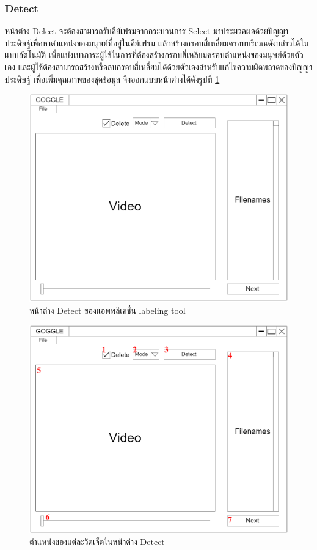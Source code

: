 \subsubsection{Detect}
หน้าต่าง Delect จะต้องสามารถรับคีย์เฟรมจากกระบวนการ Select มาประมวลผลด้วยปัญญาประดิษฐ์เพื่อหาตำแหน่งของมนุษย์ที่อยู่ในคีย์เฟรม 
แล้วสร้างกรอบสี่เหลี่ยมครอบบริเวณดังกล่าวได้ในแบบอัตโนมัติ เพื่อแบ่งเบาภาระผู้ใช้ในการที่ต้องสร้างกรอบสี่เหลี่ยมครอบตำแหน่งของมนุษย์ด้วยตัวเอง
และผู้ใช้ต้องสามารถสร้างหรือลบกรอบสี่เหลี่ยมได้ด้วยตัวเองสำหรับแก้ไขความผิดพลาดของปัญญาประดิษฐ์ เพื่อเพิ่มคุณภาพของชุดข้อมูล
จึงออกแบบหน้าต่างได้ดังรูปที่ \ref{fig:DetectDraft}
\begin{figure}[!ht]
    \centering
    \includegraphics[width=1\textwidth]{chapter3/images/3_6/DetectDraft.png}
    \caption{หน้าต่าง Detect ของแอพพลิเคชั่น labeling tool}
    \label{fig:DetectDraft}
\end{figure}
\clearpage
\begin{figure}[!ht]
    \centering
    \includegraphics[width=1\textwidth]{chapter3/images/3_6/DetectDraft_point.png}
    \caption{ตำแหน่งของแต่ละวิดเจ็ตในหน้าต่าง Detect}
    \label{fig:DelectDraft_point}
\end{figure}
